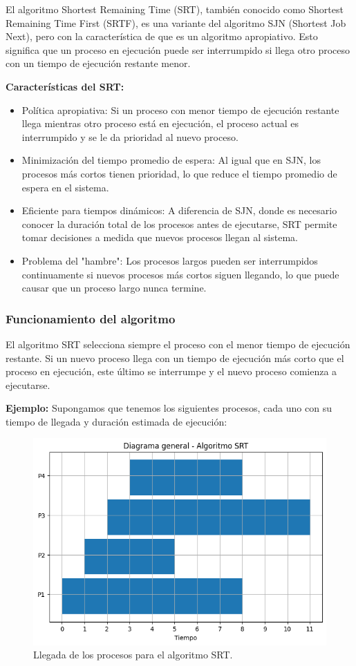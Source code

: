 El algoritmo Shortest Remaining Time (SRT), también conocido como Shortest Remaining Time First (SRTF), es una variante del algoritmo SJN (Shortest Job Next), pero con la característica de que es un algoritmo apropiativo. Esto significa que un proceso en ejecución puede ser interrumpido si llega otro proceso con un tiempo de ejecución restante menor.

\textbf{Características del SRT:}
 \begin{itemize} 
 	\item Política apropiativa: Si un proceso con menor tiempo de ejecución restante llega mientras otro proceso está en ejecución, el proceso actual es interrumpido y se le da prioridad al nuevo proceso. 
 	\item Minimización del tiempo promedio de espera: Al igual que en SJN, los procesos más cortos tienen prioridad, lo que reduce el tiempo promedio de espera en el sistema. \item Eficiente para tiempos dinámicos: A diferencia de SJN, donde es necesario conocer la duración total de los procesos antes de ejecutarse, SRT permite tomar decisiones a medida que nuevos procesos llegan al sistema. 
 	\item Problema del "hambre": Los procesos largos pueden ser interrumpidos continuamente si nuevos procesos más cortos siguen llegando, lo que puede causar que un proceso largo nunca termine. \end{itemize}

\subsubsection{Funcionamiento del algoritmo}

El algoritmo SRT selecciona siempre el proceso con el menor tiempo de ejecución restante. Si un nuevo proceso llega con un tiempo de ejecución más corto que el proceso en ejecución, este último se interrumpe y el nuevo proceso comienza a ejecutarse.

\textbf{Ejemplo:} Supongamos que tenemos los siguientes procesos, cada uno con su tiempo de llegada y duración estimada de ejecución:

\begin{figure}[H] \centering \includegraphics[width=0.8\linewidth]{Imagenes/srt_diagrama.png} 
	\caption{Llegada de los procesos para el algoritmo SRT.} 
\end{figure}

